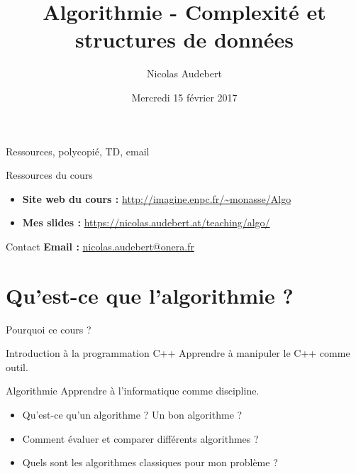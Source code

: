 \documentclass{beamer}
\begin{document}
\title{Algorithmie - Complexité et structures de données}
\date[15 fév. 2017]{Mercredi 15 février 2017}
\author[nicolas.audebert@onera.fr]{Nicolas Audebert}
\institute{}

\setmainfont{Fira Sans}
\maketitle



\newcommand{\todo}[1]{\textbf{[TODO: #1]}}

\begin{frame}{Ressources, polycopié, TD, email}

\begin{block}{Ressources du cours}
    \begin{itemize}
    \item \textbf{Site web du cours :} \url{http://imagine.enpc.fr/~monasse/Algo}
    \item \textbf{Mes slides :} \url{https://nicolas.audebert.at/teaching/algo/}
    \end{itemize}
\end{block}

\begin{exampleblock}{Contact}
    \textbf{Email :} \href{mailto:nicolas.audebert@onera.fr}{nicolas.audebert@onera.fr}
\end{exampleblock}

\end{frame}

\section{Qu'est-ce que l'algorithmie ?}
\begin{frame}{Pourquoi ce cours ?}

\begin{block}{Introduction à la programmation C++}
Apprendre à manipuler le C++ comme outil.
\end{block}

\begin{block}{Algorithmie}
Apprendre à l'informatique comme discipline.
    \begin{itemize}
        \item Qu'est-ce qu'un algorithme ? Un bon algorithme ?
        \item Comment évaluer et comparer différents algorithmes ?
        \item Quels sont les algorithmes classiques pour mon problème ?
    \end{itemize}
\end{block}

\end{frame}
\end{document}

